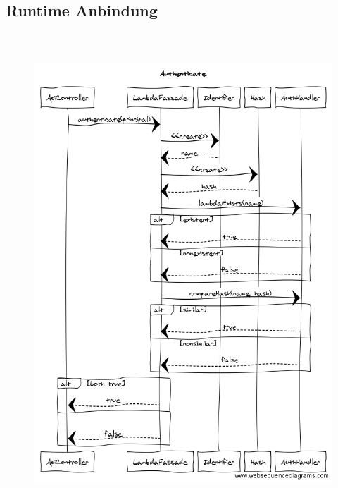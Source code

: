 \documentclass[a4paper,20pt,oneside]{book}
\begin{document}
	\subsection{Runtime Anbindung}	
	\begin{figure}[!hb]
    \includegraphics[width=18cm,height=18cm]{Authenticate}
	\end{figure}
	\newpage
\end{document}
